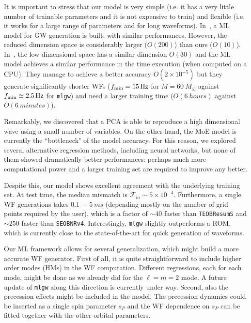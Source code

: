 It is important to stress that our model is very simple (i.e. it has a very little number of trainable parameters and 
it is not expensive to train) and flexible (i.e. it works for a large range of parameters and for long waveforms).
In~\cite{Chua_2019}, a ML model for GW generation is built, with similar performances.
However, the reduced dimension space is considerably larger ($O(200)$) than ours ($O(10)$).
In~\cite{Khan:2020fso}, the low dimensional space has a similar dimension $O(30)$ and the ML model achieves a similar performance in the time execution (when computed on a CPU). They manage to achieve a better accuracy $O(2\times10^{-5})$ but they generate significantly shorter WFs ($f_{\rm min} = \SI{15}{Hz}$ for $M = \SI{60}{M_{\odot}}$ against $f_{\rm min} \simeq \SI{2.5}{Hz}$ for \texttt{mlgw}) and need a larger training time ($O(\SI{6}{hours})$ against $O(\SI{6}{minutes})$).

Remarkably, we discovered that a PCA is able to reproduce a high dimensional wave using a small number of variables.
On the other hand, the MoE model is currently the ``bottleneck" of the model accuracy. For this reason, we explored 
several alternative regression methods, including neural networks, but none of them showed dramatically better 
performances: perhaps much more computational power and a larger training set are required to improve any better.

Despite this, our model shows excellent agreement with the underlying training set. At test time, 
the median mismatch is ${\mathcal{F}_m\sim 5 \times 10^{-4}}$.
Furthermore, a single WF generations takes $\SI{0.1}{}-\SI{5}{ms}$ (depending mostly on the 
number of grid points required by the user), which is a factor of $\sim 40$ faster than \texttt{TEOBResumS}
and $\sim 250$ faster than \texttt{SEOBNRv4}.
Interestingly, \texttt{mlgw} slightly outperforms a ROM, which is currently close to the state-of-the-art 
for quick generation of waveforms.

Our ML framework allows for several generalization, which might build a more accurate WF generator.
First of all, it is quite straightforward to include higher order modes (HMs) in the WF computation. 
Different regressions, each for each mode, might be done as we already did for the $\ell=m=2$ mode. 
A future update of \texttt{mlgw} along this direction is currently under way.
Second, also the precession effects might be included in the model.
The precession dynamics could be inserted as a single spin parameter $s_P$ \cite{Schmidt2015Precession} 
and the WF dependence on $s_P$ can be fitted together with the other orbital parameters.

